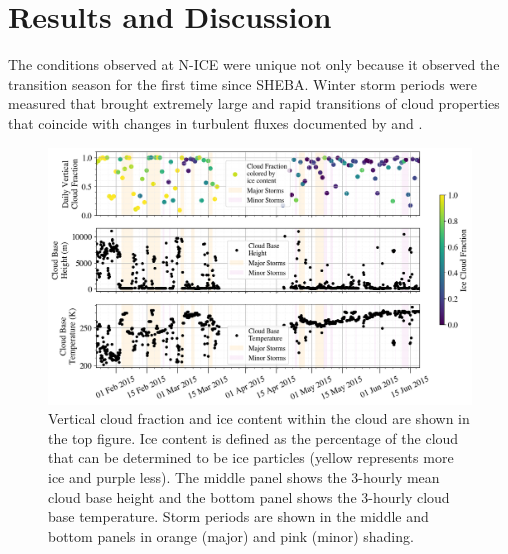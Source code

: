 \section{Results and Discussion}
The conditions observed at N-ICE were unique not only because it observed the transition season for the first time since SHEBA. Winter storm periods were measured that brought extremely large and rapid transitions of cloud properties that coincide with changes in turbulent fluxes documented by \citet{walden:2017} and \citet{graham:2017}. 

\begin{figure}[t!]
    \centering
    \includegraphics[width=1\linewidth]{figures/chapter4/CloudSummary.png}
    \caption[Cloud fraction and phase, height, and temperature time series.]{Vertical cloud fraction and ice content within the cloud are shown in the top figure. Ice content is defined as the percentage of the cloud that can be determined to be ice particles (yellow represents more ice and purple less). The middle panel shows the 3-hourly mean cloud base height and the bottom panel shows the 3-hourly cloud base temperature. Storm periods are shown in the middle and bottom panels in orange (major) and pink (minor) shading.}
    \label{fig:cloudmacro}
\end{figure}

